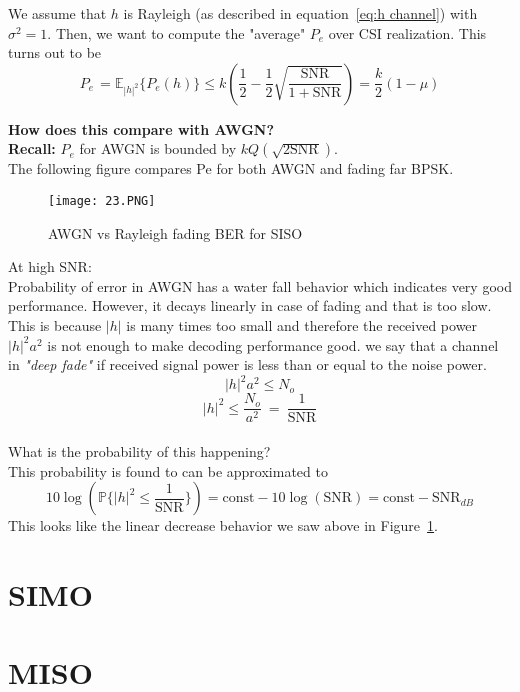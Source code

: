 We assume that $h$ is Rayleigh (as described in equation~\ref{eq:h channel}) with $\sigma^2= 1$.
Then, we want to compute the "average" $P_e$ over CSI realization. This turns out to be
\begin{equation}
    \label{eq:avg Pe for SISO}
    P_{e\ }=\mathbb{E}_{\left|h\right|^2}\{P_e\left(h\right)\} \le k \left(\frac{1}{2}-\frac{1}{2}\sqrt{\frac{\text{SNR}}{1+\text{SNR}}}\right) =\frac{k}{2}\left(1-\mu\right)
\end{equation}

\textbf{How does this compare with AWGN?} \\
\textbf{Recall:} $P_e$ for AWGN is bounded by $k Q(\sqrt{2\text{SNR}})$. \\
The following figure compares Pe for both AWGN and fading far BPSK.
\begin{figure}[h]
    \centering
    \texttt{[image: 23.PNG]}
    \caption{AWGN vs Rayleigh fading BER for SISO}
    \label{fig:BER SISO}
\end{figure}

At high SNR: \\
Probability of error in AWGN has a water fall behavior which indicates very good performance.
However, it decays linearly in case of fading and that is too slow.
This is because $|h|$ is many times too small and therefore the received power $|h|^2 a^2$ is not enough to make decoding performance good.
we say that a channel in \emph{"deep fade"} if received signal power is less than or equal to the noise power. \\
\[\left|h\right|^2a^2\le N_o\]
\[|h|^2\le \frac{N_o}{a^2}\ =\ \frac{1}{\text{SNR}}\] \\
What is the probability of this happening? \\
This probability is found to can be approximated to 
\begin{equation}
    \label{eq:SISO Pe}
    10\log\left(\mathbb{P}\{|h|^2\le \frac{1}{\text{SNR}}\} \right)= \text{const}-10\log\left(\text{SNR}\right)=\text{const}-\text{SNR}_{dB}
\end{equation}
This looks like the linear decrease behavior we saw above in Figure~\ref{fig:BER SISO}.

\section{SIMO}

\section{MISO}

